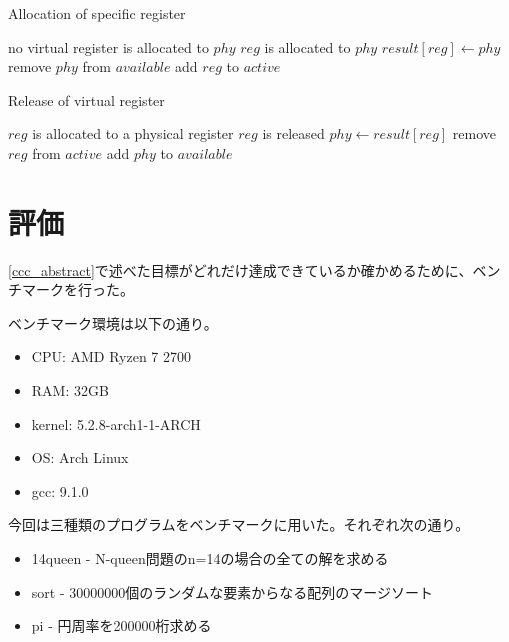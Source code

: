 \documentclass[uplatex,a4paper]{jsarticle}
\begin{document}
\begin{algorithm}
\caption{Allocation of specific register}\label{algallocreg}
\begin{algorithmic}[1]
  \Require no virtual register is allocated to $phy$
  \Ensure $reg$ is allocated to $phy$
  \State $result[reg] \gets phy$
  \State remove $phy$ from $available$
  \State add $reg$ to $active$ 
\EndProcedure
\end{algorithmic}
\end{algorithm}

\begin{algorithm}
\caption{Release of virtual register}\label{algreleasereg}
\begin{algorithmic}[1]
  \Require $reg$ is allocated to a physical register
  \Ensure $reg$ is released
  \State $phy \gets result[reg]$
  \State remove $reg$ from $active$
  \State add $phy$ to $available$ 
  \EndProcedure
\end{algorithmic}
\end{algorithm}

\clearpage
\section{評価}
\label{ccc_performance}

\cref{ccc_abstract}で述べた目標がどれだけ達成できているか確かめるために、ベンチマークを行った。

ベンチマーク環境は以下の通り。
\begin{itemize}
  \item CPU: AMD Ryzen 7 2700
  \item RAM: 32GB
  \item kernel: 5.2.8-arch1-1-ARCH
  \item OS: Arch Linux
  \item gcc: 9.1.0
\end{itemize}

今回は三種類のプログラムをベンチマークに用いた。それぞれ次の通り。
\begin{itemize}
  \item 14queen - N-queen問題のn=14の場合の全ての解を求める
  \item sort - 30000000個のランダムな要素からなる配列のマージソート
  \item pi - 円周率を200000桁求める
\end{itemize}
\end{document}
